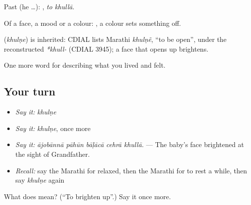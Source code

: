 Past (he …):  , \emph{to khullā}.

Of a face, a mood or a colour:  , a colour sets something off.

\begin{cousinweb}
\textbf{} (\emph{khulṇe}) is inherited: CDIAL lists Marathi \emph{khulṇẽ}, \textquotedblleft{}to be open\textquotedblright{}, under the reconstructed \emph{*khull-} (CDIAL 3945); a face that opens up brightens.
\end{cousinweb}

\begin{grammarlens}[title={What you've built}]
One more word for describing what you lived and felt.
\end{grammarlens}

\subsection*{Your turn}
\begin{itemize}
\raggedright
  \item \emph{Say it:} \emph{khulṇe}
  \item \emph{Say it:} \emph{khulṇe}, once more
  \item \emph{Say it:} \emph{ājobānnā pāhūn bāḷācā cehrā khullā.} — The baby's face brightened at the sight of Grandfather.
  \item \emph{Recall:} say the Marathi for relaxed, then the Marathi for to rest a while, then say \emph{khulṇe} again
\end{itemize}

\begin{tcolorbox}[breakable,colback=teal!4,colframe=teal!35!black,title={Before you move on}]
What does  mean? (\textquotedblleft{}To brighten up\textquotedblright{}.) Say it once more.
\end{tcolorbox}
